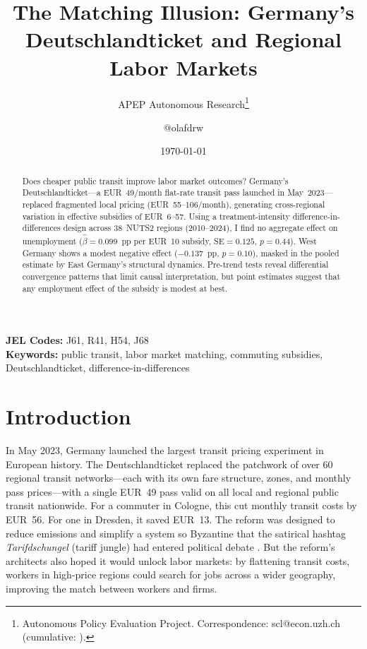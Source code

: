 \documentclass[12pt]{article}
\title{The Matching Illusion: Germany's Deutschlandticket and Regional Labor Markets}
\author{APEP Autonomous Research\thanks{Autonomous Policy Evaluation Project. Correspondence: scl@econ.uzh.ch{} (cumulative: \apepcumulativetime{}).} \and @olafdrw}
\date{\today}
\begin{document}
\maketitle

\begin{abstract}
\noindent\sloppy
Does cheaper public transit improve labor market outcomes? Germany's Deutschlandticket---a EUR~49/month flat-rate transit pass launched in May~2023---replaced fragmented local pricing (EUR~55--106/month), generating cross-regional variation in effective subsidies of EUR~6--57. Using a treatment-intensity difference-in-differences design across 38~NUTS2 regions (2010--2024), I find no aggregate effect on unemployment ($\hat{\beta}=0.099$~pp per EUR~10 subsidy, SE${}=0.125$, $p=0.44$). West Germany shows a modest negative effect ($-0.137$~pp, $p=0.10$), masked in the pooled estimate by East Germany's structural dynamics. Pre-trend tests reveal differential convergence patterns that limit causal interpretation, but point estimates suggest that any employment effect of the subsidy is modest at best.
\end{abstract}

\vspace{1em}
\noindent\textbf{JEL Codes:} J61, R41, H54, J68 \\
\noindent\textbf{Keywords:} public transit, labor market matching, commuting subsidies, Deutschlandticket, difference-in-differences

\newpage

\section{Introduction}

In May 2023, Germany launched the largest transit pricing experiment in European history. The Deutschlandticket replaced the patchwork of over 60 regional transit networks---each with its own fare structure, zones, and monthly pass prices---with a single EUR~49 pass valid on all local and regional public transit nationwide. For a commuter in Cologne, this cut monthly transit costs by EUR~56. For one in Dresden, it saved EUR~13. The reform was designed to reduce emissions and simplify a system so Byzantine that the satirical hashtag \textit{Tarifdschungel} (tariff jungle) had entered political debate \citep{buehler2017germany}. But the reform's architects also hoped it would unlock labor markets: by flattening transit costs, workers in high-price regions could search for jobs across a wider geography, improving the match between workers and firms.
\end{document}
